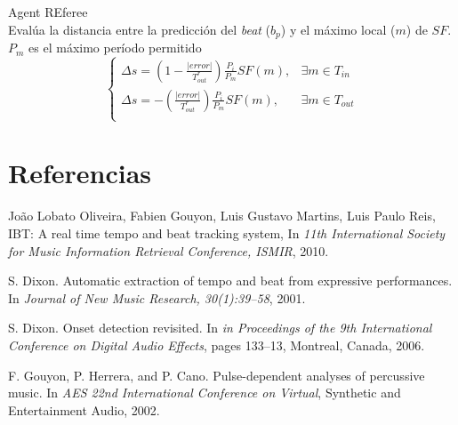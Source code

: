 \documentclass[12pt,a4paper,titlepage]{report}
\begin{document}
Agent REferee\\
Evalúa la distancia entre la predicción del \emph{beat} ($b_p$) y el máximo local ($m$) de $SF$. $P_m$ es el máximo período permitido\\
$$\begin{cases}
\Delta s = \left(1-\frac{|error|}{T^r_{out}} \right)\frac{P_i}{P_m}SF(m), & \exists m \in T_{in}\\
\Delta s = -\left(\frac{|error|}{T^r_{out}} \right)\frac{P_i}{P_m}SF(m), & \exists m \in T_{out}\\
\end{cases}$$



\section*{Referencias}
\begin{thebibliography}{99}
\begin{small}

Jo\~ao Lobato Oliveira, Fabien Gouyon, Luis Gustavo Martins, Luis Paulo Reis, IBT: A real time tempo and beat tracking system, In \emph{11th International Society for Music Information Retrieval Conference, ISMIR}, 2010.

S. Dixon. Automatic extraction of tempo and beat from
expressive performances. In \emph{Journal of New Music Research, 30(1):39–58}, 2001.

S. Dixon. Onset detection revisited. In \emph{in Proceedings of the 9th International Conference on Digital Audio Effects}, pages 133–13, Montreal, Canada, 2006.

F. Gouyon, P. Herrera, and P. Cano. Pulse-dependent analyses of percussive music. In \emph{AES 22nd International Conference on Virtual}, Synthetic and Entertainment Audio, 2002.

\end{small}
\end{thebibliography}
\end{document}
